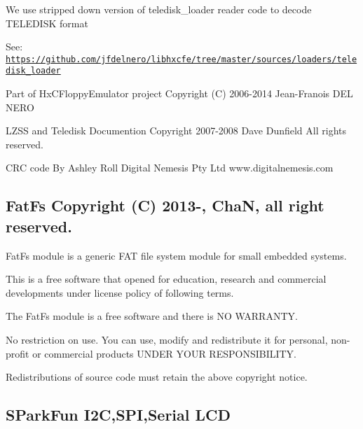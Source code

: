 \begin{DoxyItemize}
\item We use stripped down version of teledisk\+\_\+loader reader code to decode T\+E\+L\+E\+D\+I\+SK format
\begin{DoxyItemize}
\item See\+: \href{https://github.com/jfdelnero/libhxcfe/tree/master/sources/loaders/teledisk_loader}{\tt https\+://github.\+com/jfdelnero/libhxcfe/tree/master/sources/loaders/teledisk\+\_\+loader}
\begin{DoxyItemize}
\item Part of Hx\+C\+Floppy\+Emulator project Copyright (C) 2006-\/2014 Jean-\/\+Franois D\+EL N\+E\+RO
\item L\+Z\+SS and Teledisk Documention Copyright 2007-\/2008 Dave Dunfield All rights reserved.
\item C\+RC code By Ashley Roll Digital Nemesis Pty Ltd www.\+digitalnemesis.\+com 


\end{DoxyItemize}
\end{DoxyItemize}
\end{DoxyItemize}

\subsection*{Fat\+Fs Copyright (C) 2013-\/, ChaN, all right reserved.}

Fat\+Fs module is a generic F\+AT file system module for small embedded systems.

This is a free software that opened for education, research and commercial developments under license policy of following terms.


\begin{DoxyItemize}
\item The Fat\+Fs module is a free software and there is NO W\+A\+R\+R\+A\+N\+TY.
\item No restriction on use. You can use, modify and redistribute it for personal, non-\/profit or commercial products U\+N\+D\+ER Y\+O\+UR R\+E\+S\+P\+O\+N\+S\+I\+B\+I\+L\+I\+TY.
\item Redistributions of source code must retain the above copyright notice.
\end{DoxyItemize}





\subsection*{S\+Park\+Fun I2C,S\+PI,Serial L\+CD}


